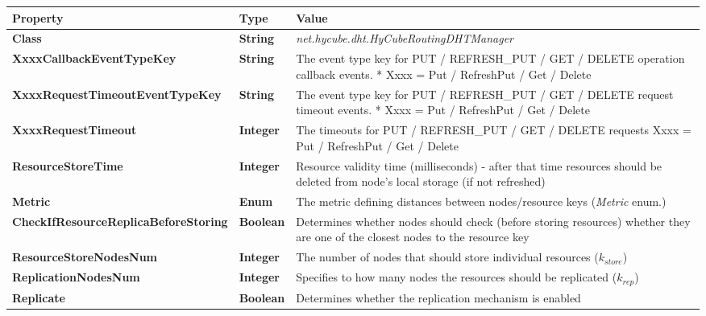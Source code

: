 \begin{center}
\scriptsize
\begin{longtable}{p{5cm} p{1.2cm} p{8.3cm}}
	\hline
	\textbf{Property}									& \textbf{Type}					& \textbf{Value}					\\[1mm]
    \hline
	\textbf{Class}										& \textbf{String}				& \textit{net.hycube.dht.HyCubeRoutingDHTManager}									\\[1.5mm]	
	\textbf{XxxxCallbackEventTypeKey} 					& \textbf{String}				& The event type key for PUT / REFRESH\_PUT / GET / DELETE operation callback events. * Xxxx = Put / RefreshPut / Get / Delete		\\[1.5mm]	
	\textbf{XxxxRequestTimeoutEventTypeKey} 			& \textbf{String}				& The event type key for PUT / REFRESH\_PUT / GET / DELETE request timeout events. * Xxxx = Put / RefreshPut / Get / Delete			\\[1.5mm]	
	\textbf{XxxxRequestTimeout}							& \textbf{Integer}				& The timeouts for PUT / REFRESH\_PUT / GET / DELETE requests \newline * Xxxx = Put / RefreshPut / Get / Delete								\\[1.5mm]	
	\textbf{ResourceStoreTime}							& \textbf{Integer}				& Resource validity time (milliseconds) - after that time resources should be deleted from node's local storage (if not refreshed)	\\[1.5mm]	
	\textbf{Metric}										& \textbf{Enum}					& The metric defining distances between nodes/resource keys (\emph{Metric} enum.)			\\[1.5mm]	
	\textbf{CheckIfResourceReplicaBeforeStoring}		& \textbf{Boolean}				& Determines whether nodes should check (before storing resources) whether they are one of the closest nodes to the resource key			\\[1.5mm]	
	\textbf{ResourceStoreNodesNum}						& \textbf{Integer}				& The number of nodes that should store individual resources ($k_{store}$)			\\[1.5mm]	
	\textbf{ReplicationNodesNum}						& \textbf{Integer}				& Specifies to how many nodes the resources should be replicated ($k_{rep}$)				\\[1.5mm]	
	\textbf{Replicate}									& \textbf{Boolean}				& Determines whether the replication mechanism is enabled						\\[1.5mm]	

\end{longtable}
\end{center}
